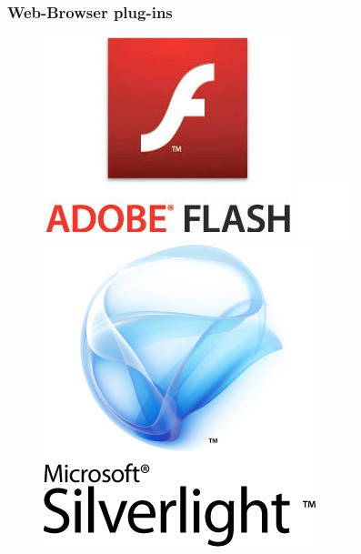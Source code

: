 \documentclass[compress]{beamer}
\begin{document}
 		\begin{frame}[c]
		\frametitle{Web-Browser plug-ins}
		\begin{figure}
			\includegraphics[height=0.3\textheight]{figures/flash.jpg}
			\includegraphics[height=0.1\textheight]{figures/space.png}
			\includegraphics[height=0.3\textheight]{figures/silverlight.png}
		\end{figure}
		\end{frame}
\end{document}
